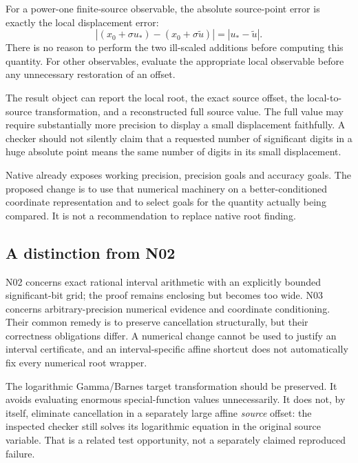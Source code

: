 \documentclass[11pt,a4paper]{article}
\newcommand{\code}[1]{\texttt{\detokenize{#1}}}
\begin{document}
For a power-one finite-source observable, the absolute source-point error is exactly the local displacement error:
\begin{equation}\label{eq:local-error}
 |(x_0+\sigma u_*)-(x_0+\sigma \widetilde u)|
 =|u_*-\widetilde u|.
\end{equation}
There is no reason to perform the two ill-scaled additions before computing this quantity. For other observables, evaluate the appropriate local observable before any unnecessary restoration of an offset.

The result object can report the local root, the exact source offset, the local-to-source transformation, and a reconstructed full source value. The full value may require substantially more precision to display a small displacement faithfully. A checker should not silently claim that a requested number of significant digits in a huge absolute point means the same number of digits in its small displacement.

Native \code{FindRoot} already exposes working precision, precision goals and accuracy goals. The proposed change is to use that numerical machinery on a better-conditioned coordinate representation and to select goals for the quantity actually being compared. It is not a recommendation to replace native root finding.\cite{wl-findroot}

\subsection{A distinction from N02}

N02 concerns exact rational interval arithmetic with an explicitly bounded significant-bit grid; the proof remains enclosing but becomes too wide. N03 concerns arbitrary-precision numerical evidence and coordinate conditioning. Their common remedy is to preserve cancellation structurally, but their correctness obligations differ. A numerical change cannot be used to justify an interval certificate, and an interval-specific affine shortcut does not automatically fix every numerical root wrapper.

The logarithmic Gamma/Barnes target transformation should be preserved. It avoids evaluating enormous special-function values unnecessarily. It does not, by itself, eliminate cancellation in a separately large affine \emph{source} offset: the inspected checker still solves its logarithmic equation in the original source variable. That is a related test opportunity, not a separately claimed reproduced failure.\cite{gamma-checks}
\end{document}
